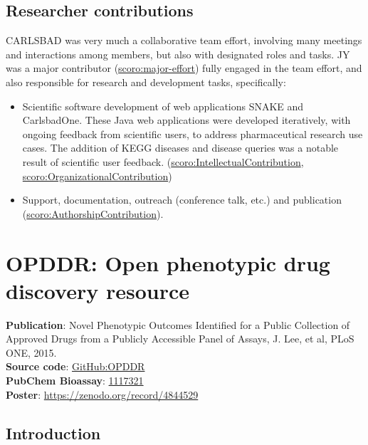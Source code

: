 \subsection{Researcher contributions}

CARLSBAD was very much a collaborative team effort, involving many meetings and interactions among members, but also with designated roles and tasks. JY was a major contributor (\href{http://purl.org/spar/scoro/major-effort}{scoro:major-effort}) fully engaged in the team effort, and also responsible for research and development tasks, specifically:

\begin{itemize}[topsep=0pt,itemsep=0pt,partopsep=0pt,parsep=0pt]
    \item Scientific software development of web applications SNAKE and CarlsbadOne. These Java web applications were developed iteratively, with ongoing feedback from scientific users, to address pharmaceutical research use cases. The addition of KEGG diseases and disease queries was a notable result of scientific user feedback. (\href{http://purl.org/spar/scoro/IntellectualContribution}{scoro:IntellectualContribution}, \href{http://purl.org/spar/scoro/OrganizationalContribution}{scoro:OrganizationalContribution})
    \item Support, documentation, outreach (conference talk, etc.) and publication (\href{http://purl.org/spar/scoro/AuthorshipContribution}{scoro:AuthorshipContribution}). 
\end{itemize}

\newpage

\section{OPDDR: Open phenotypic drug discovery resource}
\label{section:opddr}

\textbf{Publication}: Novel Phenotypic Outcomes Identified for a Public Collection of Approved Drugs from a Publicly Accessible Panel of Assays, J. Lee, et al, PLoS ONE, 2015\cite{Lee2015-vg}.\\
\textbf{Source code}: \href{https://github.com/IUIDSL/OPDDR}{GitHub:OPDDR}\\
\textbf{PubChem Bioassay}: \href{https://pubchem.ncbi.nlm.nih.gov/bioassay/1117321}{1117321}\\
\textbf{Poster}: \href{https://zenodo.org/record/4844529}{https://zenodo.org/record/4844529}

\subsection{Introduction}

